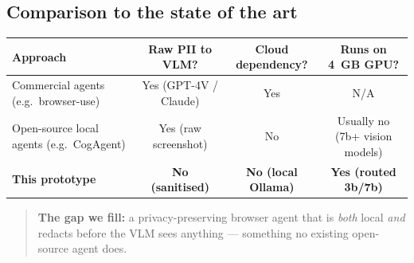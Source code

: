 \documentclass[11pt,a4paper]{article}
\begin{document}
\subsection{Comparison to the state of the art}
\begin{table}[H]
\centering
\small
\begin{tabularx}{\textwidth}{@{}>{\raggedright\arraybackslash}p{4.6cm} c c c@{}}
\toprule
\textbf{Approach} & \textbf{Raw PII to VLM?} & \textbf{Cloud dependency?} & \textbf{Runs on 4~GB GPU?}\\
\midrule
Commercial agents (e.g.\ browser-use) & Yes (GPT-4V / Claude) & Yes & N/A\\
Open-source local agents (e.g.\ CogAgent) & Yes (raw screenshot) & No & Usually no (7b+ vision models)\\
\textbf{This prototype} & \textbf{No (sanitised)} & \textbf{No (local Ollama)} & \textbf{Yes (routed 3b/7b)}\\
\bottomrule
\end{tabularx}
\end{table}

\begin{quote}
\centering
\textbf{The gap we fill:} a privacy-preserving browser agent that is \emph{both} local \emph{and} redacts before the VLM sees anything --- something no existing open-source agent does.
\end{quote}

\end{document}
